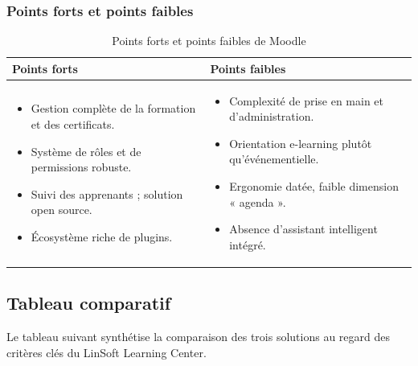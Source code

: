 \documentclass[12pt,a4paper,oneside]{report}
\begin{document}
\subsubsection{Points forts et points faibles}
\begin{table}[H]\centering\renewcommand{\arraystretch}{1.25}
\begin{tabular}{|p{}|p{}|}\hline
\rowcolor{gray!15}\textbf{Points forts} & \textbf{Points faibles} \\ \hline
\begin{itemize}[leftmargin=*,topsep=4pt,itemsep=2pt]
  \item Gestion complète de la formation et des certificats.
  \item Système de rôles et de permissions robuste.
  \item Suivi des apprenants ; solution open source.
  \item Écosystème riche de plugins.
\end{itemize}
&
\begin{itemize}[leftmargin=*,topsep=4pt,itemsep=2pt]
  \item Complexité de prise en main et d'administration.
  \item Orientation e-learning plutôt qu'événementielle.
  \item Ergonomie datée, faible dimension « agenda ».
  \item Absence d'assistant intelligent intégré.
\end{itemize} \\ \hline
\end{tabular}
\caption{Points forts et points faibles de Moodle}\label{tab:moodle}
\end{table}

\subsection{Tableau comparatif}
Le tableau suivant synthétise la comparaison des trois solutions au regard des critères clés
du LinSoft Learning Center.
\end{document}
